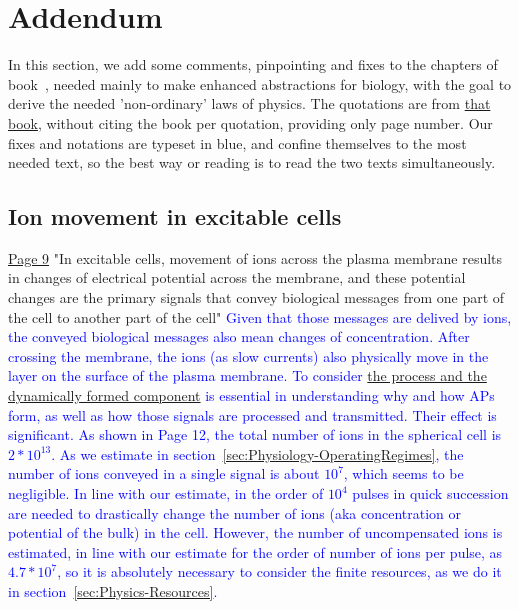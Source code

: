 
\section{Addendum\label{sec:Physics-Addendum}}

In this section, we add some comments, pinpointing and fixes to the chapters of book~\cite{JohnstonWuNeurophysiology:1995}, needed mainly to make 
enhanced abstractions for biology, with the goal to derive the needed 'non-ordinary' laws of physics. The quotations are from \href{https://rcweb.dartmouth.edu/~mvdm/wiki/lib/exe/fetch.php?media=analysis:johnstonwu.pdf}{that book},
without citing the book per quotation, providing only page number. Our fixes and notations are
typeset in blue, and confine themselves to the most needed text,
so the best way or reading is to read the two texts simultaneously.

\subsection{Ion movement in excitable cells\label{sec:Physics-IonMovement}}
\href{https://rcweb.dartmouth.edu/~mvdm/wiki/lib/exe/fetch.php?media=analysis:johnstonwu.pdf}{Page 9} "In excitable cells, movement of
ions across the plasma membrane results in changes of electrical potential
across the membrane, and these potential changes are the primary signals
that convey biological messages from one part of the cell to another part
of the cell" \textcolor{blue}{Given that those messages are delived by ions, the conveyed biological messages also mean changes of concentration. After crossing the membrane,
the ions (as slow currents) also physically move in the layer on the surface of 
the plasma membrane. To consider \hyperlink{atomic_layer}
{the process and the dynamically formed component} is essential in understanding why and how
APs form, as well as how those signals are processed and transmitted. Their effect is significant. As shown in Page 12, the total number of ions in the spherical cell is $2*10^{13}$. As we estimate in section~\ref{sec:Physiology-OperatingRegimes}, the number of ions conveyed in a single signal is about $10^{7}$, which seems to be negligible. In line with our estimate, in the order of $10^4$ pulses in quick succession are needed to drastically change the number of ions (aka concentration or potential of the bulk) in the cell. However, the 
number of uncompensated ions is estimated, in line with our estimate for the order of number of ions per pulse,  as $4.7*10^7$, so it is absolutely necessary to consider
the finite resources, as we do it in section~\ref{sec:Physics-Resources}.}


